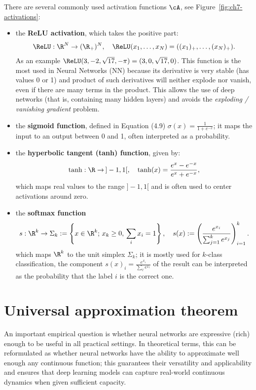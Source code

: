 There are several commonly used activation functions $\cA$, see Figure~\ref{fig:ch7-activations}:
\begin{itemize}
  \item the \textbf{ReLU activation}, which takes the positive part:
  \begin{equation}\label{eq:ch7-relu-def}
    \ReLU : \R^N \to (\R_+)^N, \quad \ReLU(x_1, \ldots, x_N) = ((x_1)_+, \ldots, (x_N)_+).
  \end{equation}
  As an example $\ReLU(3, -2, \sqrt{17}, -\pi) = (3, 0, \sqrt{17}, 0)$. This function is the most used in Neural Networks (NN) because its derivative is very stable (has values 0 or 1) and product of such derivatives will neither explode nor vanish, even if there are many terms in the product. This allows the use of deep networks (that is, containing many hidden layers) and avoids the \emph{exploding / vanishing gradient} problem.
  \item the \textbf{sigmoid function}, defined in Equation (4.9) $\sigma(x) = \frac{1}{1+e^{-x}}$; it maps the input to an output between 0 and 1, often interpreted as a probability.
  \item the \textbf{hyperbolic tangent (tanh) function}, given by:
  \begin{equation}\label{eq:ch7-tanh-def}
    \tanh : \R \to\, ]-1, 1[, \quad \tanh(x) = \frac{e^x - e^{-x}}{e^x + e^{-x}},
  \end{equation}
  which maps real values to the range $]-1, 1[$ and is often used to center activations around zero.
  \item the \textbf{softmax function}
  \begin{equation}\label{eq:ch7-softmax-def}
    s : \R^k \to \Sigma_k := \left\{ x \in \R^k;\, x_k \geq 0,\, \sum_i x_i = 1 \right\},\quad s(x) := \left( \frac{e^{x_i}}{\sum_{j=1}^k e^{x_j}} \right)_{i=1}^{k}.
  \end{equation}
  which maps $\R^k$ to the unit simplex $\Sigma_k$; it is mostly used for $k$-class classification, the component $s(x)_i = \frac{e^{x_i}}{\sum_\ell e^{x_\ell}}$ of the result can be interpreted as the probability that the label $i$ is the correct one.
\end{itemize}

\section{Universal approximation theorem}

An important empirical question is whether neural networks are expressive (rich) enough to be useful in all practical settings. In theoretical terms, this can be reformulated as whether neural networks have the ability to approximate well enough any continuous function; this guarantees their versatility and applicability and ensures that deep learning models can capture real-world continuous dynamics when given sufficient capacity.

